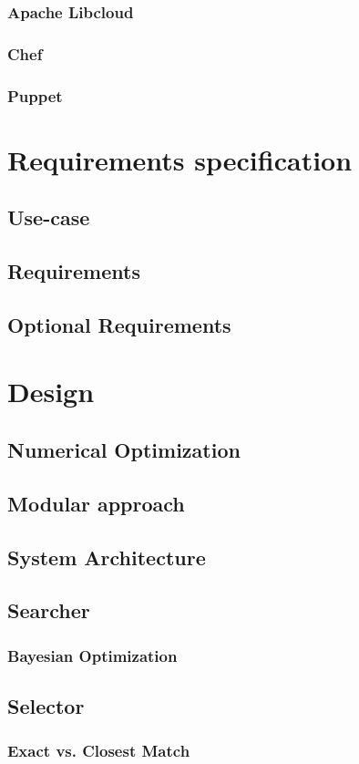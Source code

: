 \documentclass{report}
\begin{document}
\subsection{Apache Libcloud}
\subsection{Chef}
\subsection{Puppet}
\chapter{Requirements specification}
\section{Use-case}
\section{Requirements}
\section{Optional Requirements}
\chapter{Design}
\section{Numerical Optimization}
\section{Modular approach}
\section{System Architecture}
\section{Searcher}
\subsection{Bayesian Optimization}
\section{Selector}
\subsection{Exact vs. Closest Match}
\end{document}
